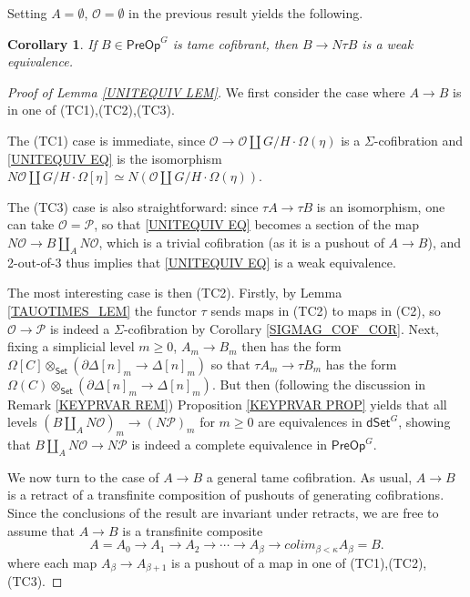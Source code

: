 \documentclass[a4paper,10pt
,draft
]{article}%
\numberwithin{equation}{section}
\numberwithin{figure}{section}
\newtheorem{corollary}[equation]{Corollary}%
\theoremstyle{definition} %
\renewcommand{\O}{\ensuremath{\mathcal O}}
\renewcommand{\P}{\ensuremath{\mathcal P}}
\newcommand{\1}{\ensuremath{\mathbbm 1}}%
\begin{document}
Setting $A = \emptyset $, $\mathcal{O}= \emptyset$ in the previous result yields the following.

\begin{corollary}\label{KEYEQUIV COR}
	If $B \in \mathsf{PreOp}^G$ is tame cofibrant, then 
	$B \to N \tau B$ is a weak equivalence.
\end{corollary}

\begin{proof}[Proof of Lemma \ref{UNITEQUIV LEM}]
	We first consider the case where $A\to B$ is in one of (TC1),(TC2),(TC3).
	
	The (TC1) case is immediate, 
	since $\mathcal{O} \to \mathcal{O} \amalg G/H \cdot \Omega(\eta)$ is a $\Sigma$-cofibration and
	\eqref{UNITEQUIV EQ}
	is the isomorphism
	$N\mathcal{O} \amalg G/H\cdot \Omega[\eta] \simeq 
	N\left( \mathcal{O} \amalg G/H \cdot \Omega(\eta) \right)$.
	
	The (TC3) case is also straightforward:
	since $\tau A \to \tau B$ is an isomorphism, one can take 
	$\mathcal{O}=\mathcal{P}$, so that 
	\eqref{UNITEQUIV EQ}
	becomes a section of the map
	$N \mathcal{O} \to B \amalg_{A} N \mathcal{O}$, which is a trivial cofibration (as it is a pushout of $A \to B$),
	and 2-out-of-3 thus implies that \eqref{UNITEQUIV EQ} is a weak equivalence.

	The most interesting case is then (TC2).
	Firstly, by Lemma \ref{TAUOTIMES_LEM} the functor $\tau$ sends maps in (TC2) to maps in (C2), 
	so $\O \to \P$ is indeed a $\Sigma$-cofibration
	by {\color{red} Corollary \ref{SIGMAG_COF_COR}}.
	Next, fixing a simplicial level $m\geq 0$,
	$A_m \to B_m$ then has the form
	$\Omega[C] \otimes_{\mathsf{Set}} \left(\partial \Delta[n]_m \to \Delta[n]_m\right)$ so that
	$\tau A_m \to \tau B_m$ has the form
	$\Omega(C) \otimes_{\mathsf{Set}} \left(\partial \Delta[n]_m \to \Delta[n]_m\right)$.
	But then (following the discussion in 
	Remark \ref{KEYPRVAR REM})
	Proposition \ref{KEYPRVAR PROP}
	yields that all levels
	$(B \amalg_{A} N \mathcal{O})_m
	\to 
	(N \mathcal{P})_m$
	for $m \geq 0$
	are equivalences in $\mathsf{dSet}^G$,
	showing that 
	$B \amalg_{A} N \mathcal{O}
	\to 
	N \mathcal{P}$
	is indeed a complete equivalence in
	$\mathsf{PreOp}^G$.

	We now turn to the case of $A \to B$ a general tame cofibration.
	As usual, $A \to B$ is a retract of a transfinite composition of pushouts of generating cofibrations.
	Since the conclusions of the result are invariant under retracts,
	we are free to assume that $A \to B$ is a transfinite composite
	\[
	A = A_0 \to A_1 \to A_2 \to \cdots \to A_{\beta} \to 
	colim_{\beta < \kappa} A_{\beta} = B.
	\]
	where each map $A_{\beta} \to A_{\beta +1}$ is a pushout of a map in one of (TC1),(TC2),(TC3).


\end{proof}
\end{document}
